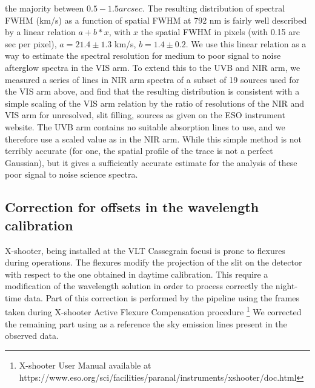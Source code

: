 \documentclass[iop, twocolappendix, numberedappendix, tighten, appendixfloats]{emulateapj}
\begin{document}
	the majority between $0.5-1.5 arcsec$.
	The resulting distribution of spectral FWHM (km/s) as a function of spatial
	FWHM at 792 nm is fairly well described by a linear relation $a + b*x$, with
	$x$ the spatial FWHM in pixels (with 0.15 arc sec per pixel),  $a= 21.4 \pm
	1.3$ km/s, $b=1.4 \pm 0.2$.
	We use this linear relation as a way to estimate the spectral resolution for
	medium to poor signal to noise afterglow spectra in the VIS arm.
	To extend this to the UVB and NIR arm, we measured a series of lines in NIR arm
	spectra of a subset of 19 sources used for the VIS arm above, and find that the
	resulting distribution is consistent with a simple scaling of the VIS arm
	relation by the ratio of resolutions of the NIR and VIS arm for unresolved,
	slit filling, sources as given on the ESO instrument website.
	The UVB arm contains no suitable absorption lines to use, and we therefore use
	a scaled value as in the NIR arm.
	While this simple method is not terribly accurate (for one, the spatial profile
	of the trace is not a perfect Gaussian), but it gives a sufficiently accurate
	estimate for the analysis of these poor signal to noise science spectra.
	

	
	\subsection{Correction for offsets in the wavelength calibration}    
	
	X-shooter, being installed at the VLT Cassegrain focusi is  prone to
	flexures during operations. The flexures modify the projection of the slit
	on the detector with respect to the one obtained in daytime calibration. 
	This require a modification of the wavelength solution in order to
	process correctly the night-time data. Part of this correction
	is performed by the pipeline using the frames taken
	during X-shooter Active Flexure Compensation procedure
	\footnote{X-shooter User Manual available at https://www.eso.org/sci/facilities/paranal/instruments/xshooter/doc.html}
	We corrected the remaining part using as a reference the sky
	emission lines present in the observed data.
	
\end{document}
